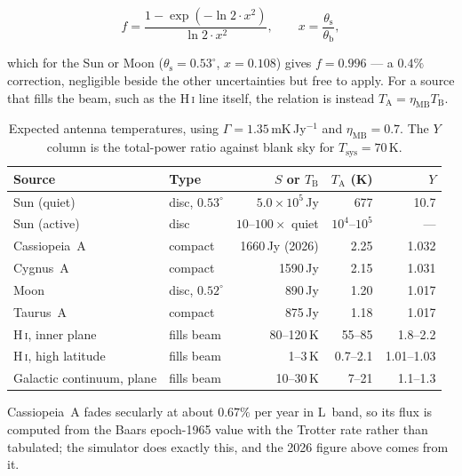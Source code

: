 \documentclass[11pt,a4paper]{article}
\begin{document}
\begin{equation}
f = \frac{1 - \exp\left(-\ln 2 \cdot x^2\right)}{\ln 2 \cdot x^2},
\qquad x = \frac{\theta_\text{s}}{\theta_\text{b}},
\label{eq:coupling}
\end{equation}

which for the Sun or Moon ($\theta_\text{s} = 0.53^\circ$, $x = 0.108$) gives $f = 0.996$ --- a $0.4\%$ correction, negligible beside the other uncertainties but free to apply. For a source that fills the beam, such as the H\,\textsc{i} line itself, the relation is instead $T_\text{A} = \eta_\text{MB} T_\text{B}$.

\begin{table}[H]
\centering
\caption{Expected antenna temperatures, using $\Gamma = 1.35$\,mK\,Jy$^{-1}$ and $\eta_\text{MB} = 0.7$. The $Y$ column is the total-power ratio against blank sky for $T_\text{sys} = 70$\,K.}
\label{tab:expectedta}
\small
\begin{tabular}{llrrr}
\toprule
\textbf{Source} & \textbf{Type} & \textbf{$S$ or $T_\text{B}$} & \textbf{$T_\text{A}$ (K)} & \textbf{$Y$} \\
\midrule
Sun (quiet) & disc, $0.53^\circ$ & $5.0\times10^5$\,Jy & 677 & 10.7 \\
Sun (active) & disc & $10$--$100\times$ quiet & $10^4$--$10^5$ & --- \\
Cassiopeia~A & compact & 1660\,Jy (2026) & 2.25 & 1.032 \\
Cygnus~A & compact & 1590\,Jy & 2.15 & 1.031 \\
Moon & disc, $0.52^\circ$ & 890\,Jy & 1.20 & 1.017 \\
Taurus~A & compact & 875\,Jy & 1.18 & 1.017 \\
\midrule
H\,\textsc{i}, inner plane & fills beam & 80--120\,K & 55--85 & 1.8--2.2 \\
H\,\textsc{i}, high latitude & fills beam & 1--3\,K & 0.7--2.1 & 1.01--1.03 \\
Galactic continuum, plane & fills beam & 10--30\,K & 7--21 & 1.1--1.3 \\
\bottomrule
\end{tabular}
\end{table}

Cassiopeia~A fades secularly at about $0.67\%$ per year in L~band, so its flux is computed from the Baars \cite{baars} epoch-1965 value with the Trotter \cite{trotter} rate rather than tabulated; the simulator does exactly this, and the 2026 figure above comes from it.
\end{document}
